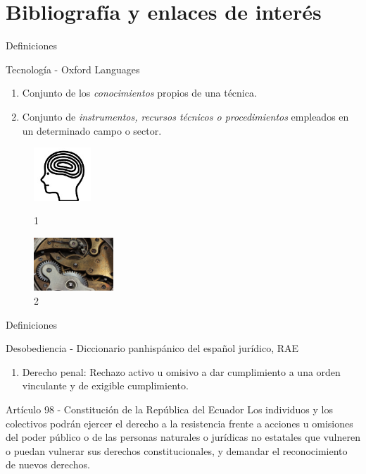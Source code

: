 \documentclass[spanish]{beamer}
\begin{document}
\section{Bibliografía y enlaces de interés}

\begin{frame}{Definiciones}
    \begin{block}{Tecnología - Oxford Languages}
        \begin{enumerate}
            \item Conjunto de los \emph{conocimientos} propios de una técnica.
            \item Conjunto de \emph{instrumentos, recursos técnicos o procedimientos} empleados en un determinado campo o sector.
        \end{enumerate}                             
    \end{block}
    \begin{figure}[htb!]        
            \hspace*{1.5cm}\includegraphics[height=2cm]{img/mind.jpg}\caption{ 1}
        \endminipage\hfill
            \hspace*{1.5cm}\includegraphics[height=2cm]{img/clockwork.jpg}\caption{ 2}
        \endminipage\hfill
    \end{figure}
\end{frame}
\begin{frame}{Definiciones}
    \begin{block}{Desobediencia - Diccionario panhispánico del español jurídico, RAE}
        \begin{enumerate}
            \item Derecho penal: Rechazo activo u omisivo a dar cumplimiento a una orden vinculante y de exigible cumplimiento.
        \end{enumerate}
    \end{block}
    \begin{block}{Artículo 98 - Constitución de la República del Ecuador}
        Los individuos y los colectivos podrán ejercer el derecho a la resistencia frente a acciones u omisiones del poder público o de las personas naturales o jurídicas no estatales que vulneren o puedan vulnerar sus derechos constitucionales, y demandar el reconocimiento de nuevos derechos.
    \end{block}
\end{frame}
\end{document}
